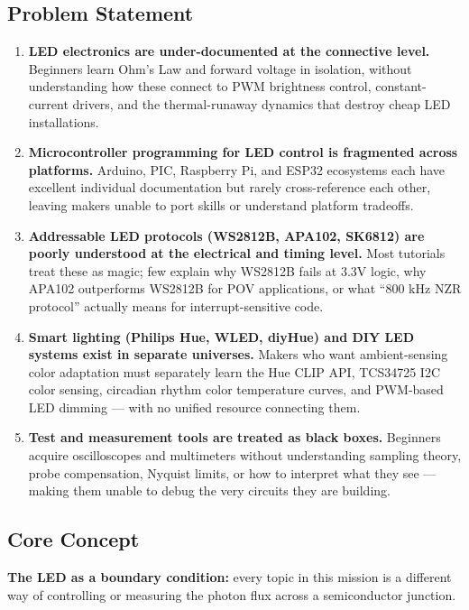 \documentclass[11pt,letterpaper]{article}
\begin{document}
\subsection{Problem Statement}

\begin{enumerate}
  \item \textbf{LED electronics are under-documented at the connective level.} Beginners learn Ohm's Law and forward voltage in isolation, without understanding how these connect to PWM brightness control, constant-current drivers, and the thermal-runaway dynamics that destroy cheap LED installations.

  \item \textbf{Microcontroller programming for LED control is fragmented across platforms.} Arduino, PIC, Raspberry Pi, and ESP32 ecosystems each have excellent individual documentation but rarely cross-reference each other, leaving makers unable to port skills or understand platform tradeoffs.

  \item \textbf{Addressable LED protocols (WS2812B, APA102, SK6812) are poorly understood at the electrical and timing level.} Most tutorials treat these as magic; few explain why WS2812B fails at 3.3V logic, why APA102 outperforms WS2812B for POV applications, or what ``800 kHz NZR protocol'' actually means for interrupt-sensitive code.

  \item \textbf{Smart lighting (Philips Hue, WLED, diyHue) and DIY LED systems exist in separate universes.} Makers who want ambient-sensing color adaptation must separately learn the Hue CLIP API, TCS34725 I2C color sensing, circadian rhythm color temperature curves, and PWM-based LED dimming --- with no unified resource connecting them.

  \item \textbf{Test and measurement tools are treated as black boxes.} Beginners acquire oscilloscopes and multimeters without understanding sampling theory, probe compensation, Nyquist limits, or how to interpret what they see --- making them unable to debug the very circuits they are building.
\end{enumerate}

\subsection{Core Concept}

\textbf{The LED as a boundary condition:} every topic in this mission is a different way of controlling or measuring the photon flux across a semiconductor junction.
\end{document}
